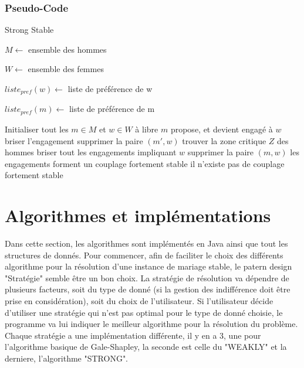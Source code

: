 \documentclass[11pt]{article}
\begin{document}
\subsubsection{Pseudo-Code}
\begin{algorithm}
\caption{Strong Stable}
\begin{algorithmic} 
\REQUIRE 
\begin{list}{}{'}
	\item $M \leftarrow$ ensemble des hommes
	\item $W \leftarrow$ ensemble des femmes
    \item $liste_{pref}(w) \leftarrow$ liste de préférence de w 
    \item $liste_{pref}(m) \leftarrow$ liste de préférence de m
\end{list}
\STATE Initialiser tout les $m \in M$ et $w \in W$ à libre
\REPEAT 
			\STATE $m$ propose, et devient engagé à $w$
					\STATE briser l'engagement
				\ENDIF
				\STATE supprimer la paire $(m', w)$
			\ENDFOR
		\ENDFOR
	\ENDWHILE
		\STATE trouver la zone critique $Z$ des hommes
			\STATE briser tout les engagements impliquant $w$
				\STATE supprimer la paire $(m, w)$				
			\ENDFOR
		\ENDFOR
	\ENDIF
{}
	\STATE les engagements forment un couplage fortement stable 
\ELSE
\STATE il n'existe pas de couplage fortement stable 
\ENDIF

\end{algorithmic}
\end{algorithm}

\section{Algorithmes et implémentations}\label{algo}
Dans cette section, les algorithmes sont implémentés en Java ainsi que tout
les structures de donnés. Pour commencer, afin de faciliter le choix des
différents algorithme pour la résolution d'une instance de mariage stable,
le patern design "Stratégie" semble être un bon choix. La stratégie de
résolution va dépendre de plusieurs facteurs, soit du type de donné (si
la gestion des indifférence doit être prise en considération), soit du
choix de l'utilisateur. Si l'utilisateur décide d'utiliser une stratégie
qui n'est pas optimal pour le type de donné choisie, le programme va lui
indiquer le meilleur algorithme pour la résolution du problème. Chaque
stratégie a une implémentation différente, il y en a 3, une pour
l'algorithme basique de Gale-Shapley, la seconde est celle du "WEAKLY" et la derniere, l'algorithme "STRONG".
\end{document}
